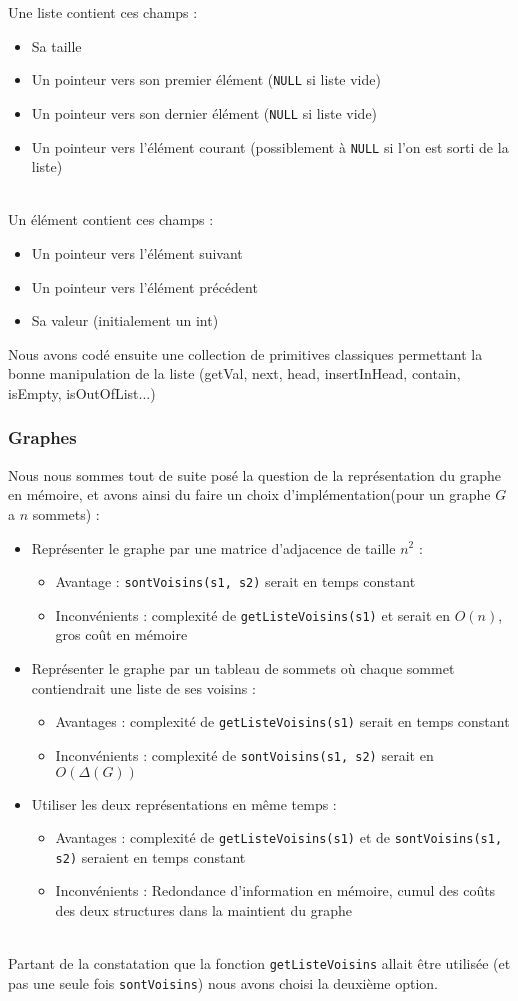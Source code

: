 \documentclass[a4paper,10pt]{article}
\newcommand*{\itemb}{\item[$\bullet$]}
\begin{document}
Une liste contient ces champs :
\begin{itemize}
	\itemb Sa taille
	\itemb Un pointeur vers son premier élément (\texttt{NULL} si liste vide)
	\itemb Un pointeur vers son dernier élément (\texttt{NULL} si liste vide)
	\itemb Un pointeur vers l'élément courant (possiblement à \texttt{NULL} si l'on est sorti de la liste)
\end{itemize}
~~\\
Un élément contient ces champs :
\begin{itemize}
	\itemb Un pointeur vers l'élément suivant
	\itemb Un pointeur vers l'élément précédent
	\itemb Sa valeur (initialement un int)
\end{itemize}

Nous avons codé ensuite une collection de primitives classiques permettant la bonne manipulation de la liste (getVal, next, head, insertInHead, contain, isEmpty, isOutOfList...)

\subsubsection{Graphes}

Nous nous sommes tout de suite posé la question de la représentation du graphe en mémoire, et avons ainsi du faire un choix d'implémentation(pour un graphe $G$ a $n$ sommets) :
\begin{itemize}
	\itemb Représenter le graphe par une matrice d'adjacence de taille $n^2$ :
	\begin{itemize}
		\item Avantage : \texttt{sontVoisins(s1, s2)} serait en temps constant
		\item Inconvénients : complexité de \texttt{getListeVoisins(s1)} et serait en $O(n)$, gros coût en mémoire
	\end{itemize}
\itemb Représenter le graphe par un tableau de sommets où chaque sommet contiendrait une liste de ses voisins :
	\begin{itemize}
		\item Avantages : complexité de \texttt{getListeVoisins(s1)} serait en temps constant
	\item Inconvénients : complexité de \texttt{sontVoisins(s1, s2)} serait en $O(\Delta(G))$
	\end{itemize}
\itemb Utiliser les deux représentations en même temps :
	\begin{itemize}
		\item Avantages : complexité de \texttt{getListeVoisins(s1)} et de \texttt{sontVoisins(s1, s2)} seraient en temps constant
		\item Inconvénients : Redondance d'information en mémoire, cumul des coûts des deux structures dans la maintient du graphe
	\end{itemize}
\end{itemize}
~~\\
Partant de la constatation que la fonction \texttt{getListeVoisins} allait être utilisée (et pas une seule fois \texttt{sontVoisins}) nous avons choisi la deuxième option.
\end{document}
